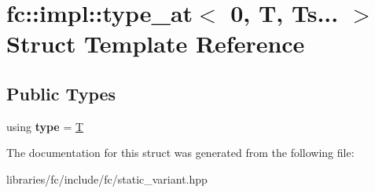 \hypertarget{structfc_1_1impl_1_1type__at_3_010_00_01_t_00_01_ts_8_8_8_01_4}{}\section{fc\+:\+:impl\+:\+:type\+\_\+at$<$ 0, T, Ts... $>$ Struct Template Reference}
\label{structfc_1_1impl_1_1type__at_3_010_00_01_t_00_01_ts_8_8_8_01_4}
\subsection*{Public Types}
\begin{DoxyCompactItemize}
\item 
\mbox{\label{structfc_1_1impl_1_1type__at_3_010_00_01_t_00_01_ts_8_8_8_01_4_a6950466f4afa5bf646242d9b985078a5}} 
using {\bfseries type} = \mbox{\hyperlink{struct_t}{T}}
\end{DoxyCompactItemize}


The documentation for this struct was generated from the following file\+:\begin{DoxyCompactItemize}
\item 
libraries/fc/include/fc/static\+\_\+variant.\+hpp\end{DoxyCompactItemize}
